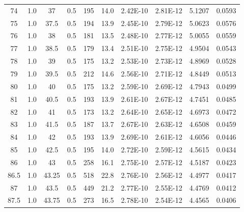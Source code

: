 \documentclass[justified]{tufte-book}
\begin{document}
\begin{table}[ht]
\begin{tabular}{cccccccccc}
74          & 1.0   & 37         & 0.5           & 195     & 14.0       & 2.42E-10    & 2.81E-12       & 5.1207    & 0.0593       \\
75          & 1.0   & 37.5       & 0.5           & 194     & 13.9       & 2.45E-10    & 2.79E-12       & 5.0623    & 0.0576       \\
76          & 1.0   & 38         & 0.5           & 181     & 13.5       & 2.48E-10    & 2.77E-12       & 5.0055    & 0.0559       \\
77          & 1.0   & 38.5       & 0.5           & 179     & 13.4       & 2.51E-10    & 2.75E-12       & 4.9504    & 0.0543       \\
78          & 1.0   & 39         & 0.5           & 175     & 13.2       & 2.53E-10    & 2.73E-12       & 4.8969    & 0.0528       \\
79          & 1.0   & 39.5       & 0.5           & 212     & 14.6       & 2.56E-10    & 2.71E-12       & 4.8449    & 0.0513       \\
80          & 1.0   & 40         & 0.5           & 175     & 13.2       & 2.59E-10    & 2.69E-12       & 4.7943    & 0.0499       \\
81          & 1.0   & 40.5       & 0.5           & 193     & 13.9       & 2.61E-10    & 2.67E-12       & 4.7451    & 0.0485       \\
82          & 1.0   & 41         & 0.5           & 173     & 13.2       & 2.64E-10    & 2.65E-12       & 4.6973    & 0.0472       \\
83          & 1.0   & 41.5       & 0.5           & 187     & 13.7       & 2.67E-10    & 2.63E-12       & 4.6508    & 0.0459       \\
84          & 1.0   & 42         & 0.5           & 193     & 13.9       & 2.69E-10    & 2.61E-12       & 4.6056    & 0.0446       \\
85          & 1.0   & 42.5       & 0.5           & 195     & 14.0       & 2.72E-10    & 2.59E-12       & 4.5615    & 0.0434       \\
86          & 1.0   & 43         & 0.5           & 258     & 16.1       & 2.75E-10    & 2.57E-12       & 4.5187    & 0.0423       \\
86.5        & 1.0   & 43.25      & 0.5           & 518     & 22.8       & 2.76E-10    & 2.56E-12       & 4.4977    & 0.0417       \\
87          & 1.0   & 43.5       & 0.5           & 449     & 21.2       & 2.77E-10    & 2.55E-12       & 4.4769    & 0.0412       \\
87.5        & 1.0   & 43.75      & 0.5           & 273     & 16.5       & 2.78E-10    & 2.54E-12       & 4.4565    & 0.0406       \\

\end{tabular}
\end{table}
\end{document}
